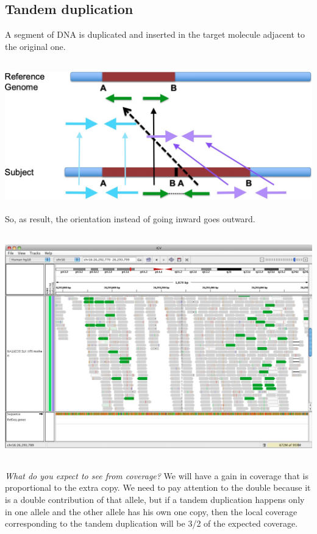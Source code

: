 \hypertarget{tandem-duplication}{%
\subsection{Tandem duplication}\label{tandem-duplication}}


A segment of DNA is duplicated and inserted in the target molecule adjacent to
the original one.


\includegraphics[width=6.1113in,height=2.55073in]{image23.jpeg}\\

So, as result, the orientation instead of going inward goes outward.\\

\includegraphics[width=6.22598in,height=4.14375in]{image24.jpeg}\\

\emph{What do you expect to see from coverage?} We will have a gain in coverage
that is proportional to the extra copy. We need to pay attention to the double
because it is a double contribution of that allele, but if a tandem duplication
happens only in one allele and the other allele has his own one copy, then the
local coverage corresponding to the tandem duplication will be 3/2 of the
expected coverage.\\

